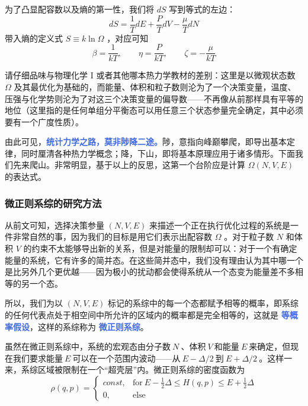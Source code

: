 \documentclass[hyperref,UTF-8]{ctexart}
\newcommand{\0}{\boldsymbol{0}}
\begin{document}
为了凸显配容数以及熵的第一性，我们将 $dS$ 写到等式的左边：
\begin{equation}
    dS = \frac{1}{T} dE + \frac{P}{T} dV - \frac{\mu}{T} dN
\end{equation}
带入熵的定义式 $S \equiv k\ln \Omega$ ，对应可知
\begin{equation}
    \beta = \frac{1}{kT} ,\quad\quad \eta = \frac{P}{kT} ,\quad\quad \zeta = -\frac{\mu}{kT} 
\end{equation}

请仔细品味与物理化学 I 或者其他哪本热力学教材的差别：这里是以微观状态数 $\Omega$ 及其最优化为基础的，而能量、体积和粒子数则沦为了一个决策变量，温度、压强与化学势则沦为了对这三个决策变量的偏导数——不再像从前那样具有平等的地位（这里指的是任何单组分平衡态可以用任意三个状态参量完全确定，其中必须要有一个广度性质）。

由此可见，\textcolor{RoyalBlue}{\textbf{\kaishu 统计力学之路，莫非陟降二途。}}陟，意指向峰巅攀爬，即导出基本定律，同时厘清各种热力学概念；降，下山，即将基本原理应用于诸多情形。下面我们先来爬山。非常明显，基于以上的反思，这第一个台阶应是计算 $\Omega (N,V,E)$ 的表达式。 


\subsubsection{微正则系综的研究方法}

从前文可知，选择决策参量 $(N,V,E)$ 来描述一个正在执行优化过程的系统是一件非常自然的事，因为我们的目标是用它们表示出配容数 $\Omega$ 。对于粒子数 $N$ 和体积 $V$ 的约束不太能够导出新的关系，但是对能量的限制却可以：对于一个有确定能量的系统，它有许多的简并态。在这些简并态中，我们没有理由认为其中哪一个是比另外几个更优越——因为极小的扰动都会使得系统从一个态变为能量差不多相等的另一个态。

所以，我们为以 $(N,V,E)$ 标记的系综中的每一个态都赋予相等的概率，即系综的任何代表点处于相空间中所允许的区域内的概率都是完全相等的，这就是 \textcolor{RoyalBlue}{\textbf{\kaishu 等概率假设}}，这样的系综称为 \textcolor{RoyalBlue}{\textbf{\kaishu 微正则系综}}。

虽然在微正则系综中，系统的宏观态由分子数$~N~$、体积$~V~$和能量$~E~$来确定，但现在我们要求能量$~E~$可以在一个范围内波动——从$~E -\Delta/2~$到$~E + \Delta/2~$。这样一来，系综区域被限制在一个“超壳层”内。微正则系综的密度函数为
\begin{equation}
\rho(q, p) = \begin{cases}const, & \text{for}~E - \displaystyle\frac{1}{2}\Delta \le H(q, p) \le E + \displaystyle\frac{1}{2}\Delta \\
0, &\text{else}
\end{cases}
\end{equation}
\end{document}
